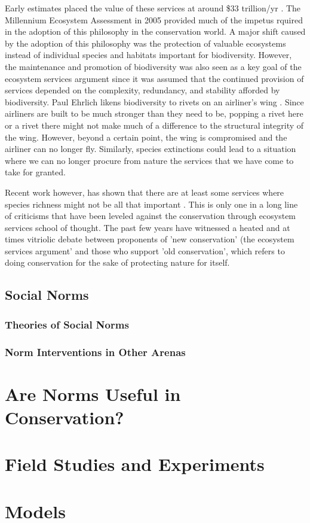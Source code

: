 \documentclass[rutwik_proposal.tex]{subfiles}
\begin{document}
Early estimates placed the value of these services at around \$33 trillion/yr \cite{dArge97}. The Millennium Ecosystem Assessment in 2005 provided much of the impetus rquired in the adoption of this philosophy in the conservation world. A major shift caused by the adoption of this philosophy was the protection of valuable ecosystems instead of individual species and habitats important for biodiversity. However, the maintenance and promotion of biodiversity was also seen as a key goal of the ecosystem services argument since it was assumed that the continued provision of services depended on the complexity, redundancy, and stability afforded by biodiversity. Paul Ehrlich likens biodiversity to rivets on an airliner's wing \cite{Ehrlichs81}. Since airliners are built to be much stronger than they need to be, popping a rivet here or a rivet there might not make much of a difference to the structural integrity of the wing. However, beyond a certain point, the wing is compromised and the airliner can no longer fly. Similarly, species extinctions could lead to a situation where we can no longer procure from nature the services that we have come to take for granted.

Recent work however, has shown that there are at least some services where species richness might not be all that important \cite{Winfree15}. This is only one in a long line of criticisms that have been leveled against the conservation through ecosystem services school of thought. The past few years have witnessed a heated and at times vitriolic debate between proponents of 'new conservation' (the ecosystem services argument' and those who support 'old conservation', which refers to doing conservation for the sake of protecting nature for itself.

\section{Social Norms}\label{sec:norms}
\subsection{Theories of Social Norms}\label{subsec:theories}
\subsection{Norm Interventions in Other Arenas}\label{subsec:interventions}

\chapter{Are Norms Useful in Conservation?}\label{ch:usefulness}

\chapter{Field Studies and Experiments}\label{ch:field}

\chapter{Models}\label{ch:models}
\end{document}
